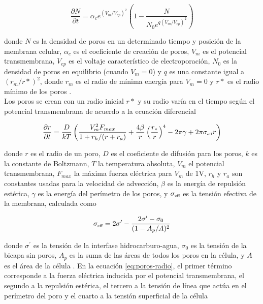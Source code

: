 \documentclass[11pt,a4paper,twoside]{tesis}
\begin{document}
\begin{equation} \label{eq:poros-crea}
	\frac{\partial N}{\partial t} = \alpha_c e^{(V_m/V_{ep})^2} \left( 1 - \frac{N}{N_0 e^{q \left(V_m/V_{ep} \right) ^2}} \right)
\end{equation}

donde $N$ es la densidad de poros en un determinado tiempo y posición de la membrana celular, $\alpha_c$ es el coeficiente de creación de poros, $V_m$ es el potencial transmembrana, $V_{ep}$ es el voltaje característico de electroporación, $N_0$ es la densidad de poros en equilibrio (cuando $V_m = 0$) y $q$ es una constante igual a $(r_m / r*)^2$, donde $r_m$ es el radio de mínima energía para $V_m = 0$ y $r*$ es el radio mínimo de los poros \cite{krass}.\\

Los poros se crean con un radio inicial $r*$ y su radio varía en el tiempo según el potencial transmembrana de acuerdo a la ecuación diferencial

\begin{equation} \label{eq:poros-radio}
	\frac{\partial r}{\partial t} = \frac{D}{kT} \left( \frac{V_m^2 F_{max}}{1+r_h / (r+r_a)} + \frac{4 \beta}{r} \left(\frac{r_*}{r}\right)^4 - 2 \pi \gamma + 2 \pi \sigma_{\textrm{\tiny eff}} r\right)
\end{equation}

donde $r$ es el radio de un poro, $D$ es el coeficiente de difusión para los poros, $k$ es la constante de Boltzmann, $T$ la temperatura absoluta, $V_m$ el potencial transmembrana, $F_{max}$ la máxima fuerza eléctrica para $V_m$ de 1V, $r_h$ y $r_a$ son constantes usadas para la velocidad de advección, $\beta$ es la energía de repulsión estérica, $\gamma$ es la energía del perímetro de los poros, y $\sigma_{\textrm{\tiny eff}}$ es la tensión efectiva de la membrana, calculada como

\begin{equation}
	\sigma_{\textrm{\tiny eff}} = 2 \sigma^\prime - \frac{2 \sigma^\prime - \sigma_0}{(1 - A_p / A)^2}
\end{equation}

donde $\sigma^\prime$ es la tensión de la interfase hidrocarburo-agua, $\sigma_0$ es la tensión de la bicapa sin poros, $A_p$ es la suma de las áreas de todos los poros en la célula, y $A$ es el área de la célula \cite{krass}. En la ecuación \ref{eq:poros-radio}, el primer término corresponde a la fuerza eléctrica inducida por el potencial transmembrana, el segundo a la repulsión estérica, el tercero a la tensión de línea que actúa en el perímetro del poro y el cuarto a la tensión superficial de la célula\\
\end{document}

